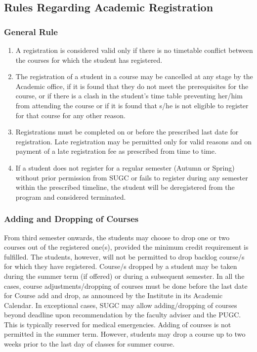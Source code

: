 \subsection{Rules Regarding Academic Registration}

\subsubsection{General Rule}

\begin{enumerate}
    \item A registration is considered valid only if there is no timetable conflict between the courses for which the student has registered. 
    \item The registration of a student in a course may be cancelled at any stage by the Academic office, if it is found that they do not meet the prerequisites for the course, or if there is a clash in the student's time table preventing her/him from attending the course or if it is found that s/he is not eligible to register for that course for any other reason.
    \item Registrations must be completed on or before the prescribed last date for registration. Late registration may be permitted only for valid reasons and on payment of a late registration fee as prescribed from time to time. 
    \item If a student does not register for a regular semester (Autumn or Spring) without prior permission from SUGC or fails to register during any semester within the prescribed timeline, the student will be deregistered from the program and considered terminated.
\end{enumerate}

\subsubsection{Adding and Dropping of Courses}

From third semester onwards, the students may choose to drop one or two courses out of the registered one(s), provided the minimum credit requirement is fulfilled. The students, however, will not be permitted to drop backlog course/s for which they have registered. Course/s dropped by a student may be taken during the summer term (if offered) or during a subsequent semester. In all the cases, course adjustments/dropping of courses must be done before the last date for Course add and drop, as announced by the Institute in its Academic Calendar. In exceptional cases, SUGC may allow adding/dropping of courses beyond deadline upon recommendation by the faculty adviser and the PUGC. This is typically reserved for medical emergencies. Adding of courses is not permitted in the summer term. However, students may drop a course up to two weeks prior to the last day of classes for summer course.

